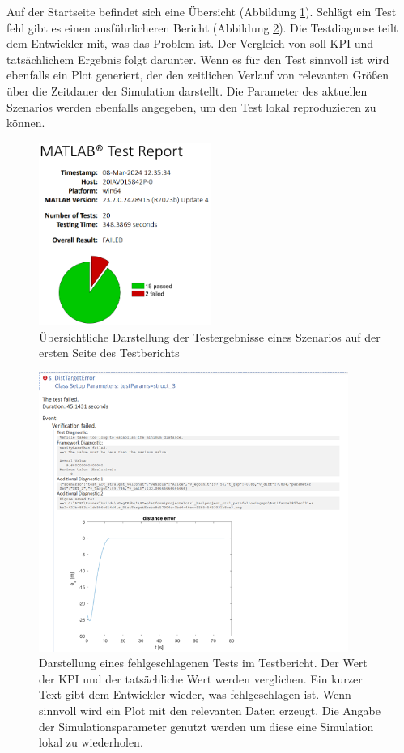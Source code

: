 Auf der Startseite befindet sich eine Übersicht (Abbildung \ref{fig:testreport_aufmacher}). Schlägt ein Test fehl gibt es einen ausführlicheren Bericht (Abbildung \ref{fig:failed_test}). Die Testdiagnose teilt dem Entwickler mit, was das Problem ist. Der Vergleich von soll KPI und tatsächlichem Ergebnis folgt darunter. Wenn es für den Test sinnvoll ist wird ebenfalls ein Plot generiert, der den zeitlichen Verlauf von relevanten Größen über die Zeitdauer der Simulation darstellt. Die Parameter des aktuellen Szenarios werden ebenfalls angegeben, um den Test lokal reproduzieren zu können.
\begin{figure}
    \centering
    \includegraphics[width=0.5\textwidth]{figures/3_Implementierung/testreport_aufmacher.png}
    \caption{Übersichtliche Darstellung der Testergebnisse eines Szenarios auf der ersten Seite des Testberichts}
    \label{fig:testreport_aufmacher}
\end{figure}
\begin{figure}
    \centering
    \includegraphics[width=0.9\textwidth]{figures/3_Implementierung/failed_test.png}
    \caption{Darstellung eines fehlgeschlagenen Tests im Testbericht. Der Wert der KPI und der tatsächliche Wert werden verglichen. Ein kurzer Text gibt dem Entwickler wieder, was fehlgeschlagen ist. Wenn sinnvoll wird ein Plot mit den relevanten Daten erzeugt. Die Angabe der Simulationsparameter genutzt werden um diese eine Simulation lokal zu wiederholen.}
    \label{fig:failed_test}
\end{figure}


